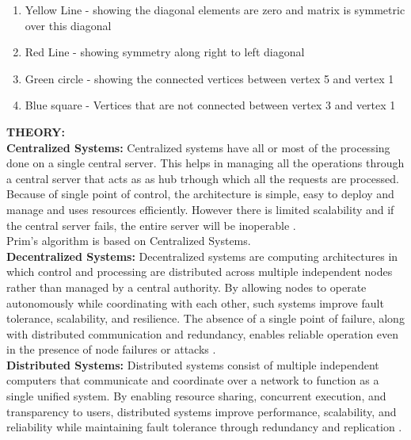 \documentclass[a4paper,12pt]{article}
\begin{document}
\noindent
\begin{enumerate}
        \item Yellow Line - showing the diagonal elements are zero and matrix is symmetric over this diagonal
        \item Red Line - showing symmetry along right to left diagonal
        \item Green circle - showing the connected vertices between vertex 5 and vertex 1
        \item Blue square - Vertices that are not connected between vertex 3 and vertex 1
\end{enumerate}
\noindent
\textbf{THEORY: }\\
\noindent
\textbf{Centralized Systems: }Centralized systems have all or most of the processing done on a single central server. This helps in managing all the operations through a central server that acts as as hub trhough which all the requests are processed. Because of single point of control, the architecture is simple, easy to deploy and manage and uses resources efficiently. However there is limited scalability and if the central server fails, the entire server will be inoperable \cite{gfg_centralized_decentralized}. \\

\noindent
Prim's algorithm is based on Centralized Systems.\\

\noindent
\textbf{Decentralized Systems: }Decentralized systems are computing architectures in which control and processing are distributed across multiple independent nodes rather than managed by a central authority. By allowing nodes to operate autonomously while coordinating with each other, such systems improve fault tolerance, scalability, and resilience. The absence of a single point of failure, along with distributed communication and redundancy, enables reliable operation even in the presence of node failures or attacks \cite{gfg_centralized_decentralized}. \\

\noindent
\textbf{Distributed Systems: }Distributed systems consist of multiple independent computers that communicate and coordinate over a network to function as a single unified system. By enabling resource sharing, concurrent execution, and transparency to users, distributed systems improve performance, scalability, and reliability while maintaining fault tolerance through redundancy and replication \cite{gfg_centralized_decentralized}.\\
\end{document}
